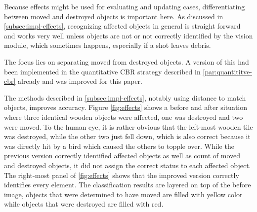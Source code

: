Because effects might be used for evaluating and updating cases, differentiating between moved and destroyed objects is important here.
As discussed in \ref{subsec:impl-effects}, recognizing affected objects in general is straight forward and works very well unless objects are not or not correctly identified by the vision module, which sometimes happens, especially if a shot leaves debris.

The focus lies on separating moved from destroyed objects.
A version of this had been implemented in the quantitative \ac{CBR} strategy described in \ref{par:quantititve-cbr} already and was improved for this paper.

The methods described in \ref{subsec:impl-effects}, notably using distance to match objects, improves accuracy. Figure \ref{fig:effects} shows a before and after situation where three identical wooden objects were affected, one was destroyed and two were moved.
To the human eye, it is rather obvious that the left-most wooden tile was destroyed, while the other two just fell down, which is also correct because it was directly hit by a bird which caused the others to topple over.
While the previous version correctly identified affected objects as well as count of moved and destroyed objects, it did not assign the correct status to each affected object.
The right-most panel of \ref{fig:effects} shows that the improved version correctly identifies every element. The classification results are layered on top of the before image, objects that were determined to have moved are filled with yellow color while objects that were destroyed are filled with red.

